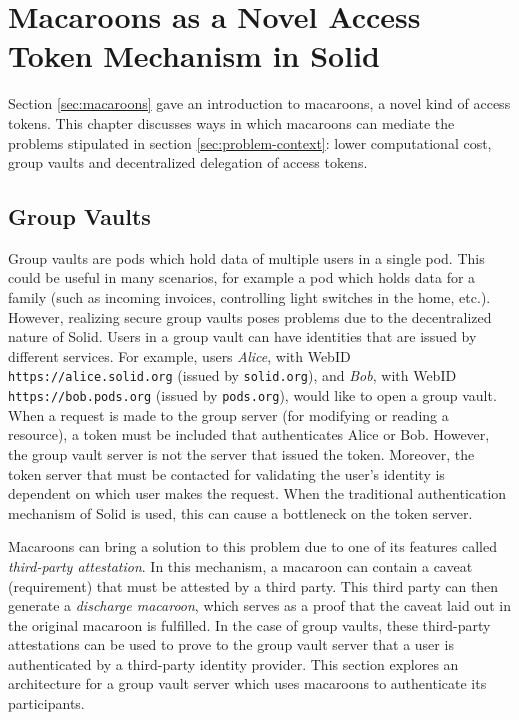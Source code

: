 \chapter{Macaroons as a Novel Access Token Mechanism in Solid}
\label{cha:decentralized-delegation}

Section \ref{sec:macaroons} gave an introduction to macaroons, a novel kind of access tokens. This chapter discusses ways in which macaroons can mediate the problems stipulated in section \ref{sec:problem-context}: lower computational cost, group vaults and decentralized delegation of access tokens. 

\section{Group Vaults}
\label{sec:group-vaults}
Group vaults are pods which hold data of multiple users in a single pod. This could be useful in many scenarios, for example a pod which holds data for a family (such as incoming invoices, controlling light switches in the home, etc.). However, realizing secure group vaults poses problems due to the decentralized nature of Solid. Users in a group vault can have identities that are issued by different services. For example, users \textit{Alice}, with WebID \texttt{https://alice.solid.org} (issued by \texttt{solid.org}), and \textit{Bob}, with WebID \texttt{https://bob.pods.org} (issued by \texttt{pods.org}), would like to open a group vault. When a request is made to the group server (for modifying or reading a resource), a token must be included that authenticates Alice or Bob. However, the group vault server is not the server that issued the token. Moreover, the token server that must be contacted for validating the user's identity is dependent on which user makes the request. When the traditional authentication mechanism of Solid is used, this can cause a bottleneck on the token server. 

Macaroons can bring a solution to this problem due to one of its features called \textit{third-party attestation}. In this mechanism, a macaroon can contain a caveat (requirement) that must be attested by a third party. This third party can then generate a \textit{discharge macaroon}, which serves as a proof that the caveat laid out in the original macaroon is fulfilled. In the case of group vaults, these third-party attestations can be used to prove to the group vault server that a user is authenticated by a third-party identity provider. This section explores an architecture for a group vault server which uses macaroons to authenticate its participants.

